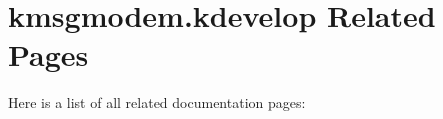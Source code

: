 \section{kmsgmodem.kdevelop Related Pages}
Here is a list of all related documentation pages:\begin{CompactList}
\item {}

\end{CompactList}
